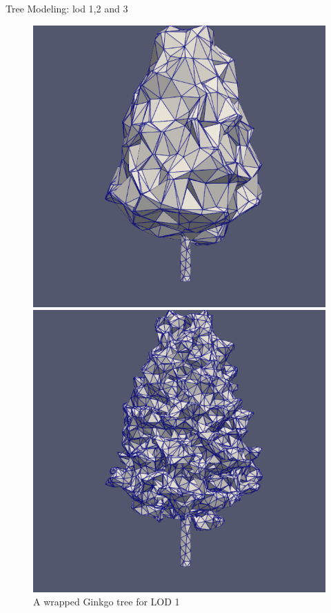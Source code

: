 \documentclass[10pt]{beamer}
\begin{document}
\begin{frame}{Tree Modeling: lod 1,2 and 3}
	\begin{figure}[h]
		\centering
		\begin{minipage}{0.3\textwidth}
			\centering
			\includegraphics[width=\textwidth]{images/tree-oval_lod1.png}
			\caption{A wrapped Ginkgo tree for LOD 1}
			\label{fig:figure1}
		\end{minipage}\hfill
		\begin{minipage}{0.3\textwidth}
			\centering
			\includegraphics[width=\textwidth]{images/tree-oval_lod2.png}

\end{minipage}
\end{figure}
\end{frame}
\end{document}
